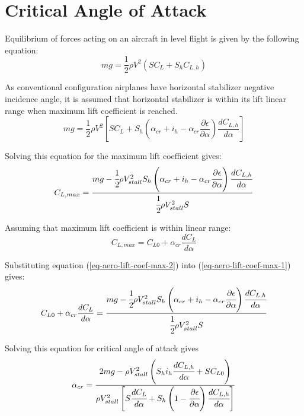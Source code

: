 \section{Critical Angle of Attack}

Equilibrium of forces acting on an aircraft in level flight is given by the following equation:
\begin{equation}
  mg = \frac{1}{2} \rho V^2 \left( S C_L + S_h C_{L,h} \right)
\end{equation}

As conventional configuration airplanes have horizontal stabilizer negative incidence angle, it is assumed that horizontal stabilizer is within its lift linear range when maximum lift coefficient is reached.
\begin{equation}
  mg = \frac{1}{2} \rho V^2
  \left[
    S C_L
    +
    S_h \left(
      \alpha_{cr} + i_h
      -
      \alpha_{cr} \frac{\partial \epsilon}{\partial \alpha}
    \right)
    \frac{d C_{L,h}}{d \alpha}
  \right]
\end{equation}

Solving this equation for the maximum lift coefficient gives:
\begin{equation}
  \label{eq-aero-lift-coef-max-1}
  C_{L,max} = 
  \frac{
    mg - \cfrac{1}{2} \rho V_{stall}^2 S_h
    \left(
      \alpha_{cr} + i_h
      -
      \alpha_{cr} \cfrac{\partial \epsilon}{\partial \alpha}
    \right)
    \cfrac{d C_{L,h}}{d \alpha}
  }
  {
    \cfrac{1}{2} \rho V_{stall}^2 S
  }
\end{equation}

Assuming that maximum lift coefficient is within linear range:
\begin{equation}
  \label{eq-aero-lift-coef-max-2}
  C_{L,max} =  C_{L0} + \alpha_{cr} \frac{d C_L}{d \alpha}
\end{equation}

Substituting equation (\ref{eq-aero-lift-coef-max-2}) into (\ref{eq-aero-lift-coef-max-1}) gives:
\begin{equation}
  C_{L0} + \alpha_{cr} \frac{d C_L}{d \alpha} =
  \frac{
    mg - \cfrac{1}{2} \rho V_{stall}^2 S_h
    \left(
      \alpha_{cr} + i_h
      -
      \alpha_{cr} \cfrac{\partial \epsilon}{\partial \alpha}
    \right)
    \cfrac{d C_{L,h}}{d \alpha}
  }
  {
    \cfrac{1}{2} \rho V_{stall}^2 S
  }
\end{equation}

Solving this equation for critical angle of attack gives
\begin{equation}
  \label{eq-aero-alpha-critical}
  \alpha_{cr} =
  \frac{
    2mg - \rho V_{stall}^2
    \left(
      S_h i_h \cfrac{d C_{L,h}}{d \alpha}
      +
      S C_{L0}
    \right)
  }
  {
    \rho V_{stall}^2
    \left[
      S \cfrac{d C_L}{d \alpha}
      +
      S_h \left( 1 - \cfrac{\partial \epsilon}{\partial \alpha} \right)
      \cfrac{d C_{L,h}}{d \alpha}
    \right]
  }
\end{equation}
